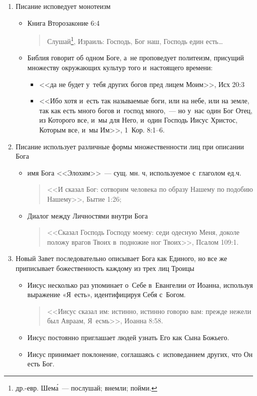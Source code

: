 \documentclass[a4paper,12pt]{article}
\begin{document}
\begin{enumerate}
    \item Писание исповедует монотеизм
        \begin{itemize}
        \item Книга Второзаконие 6:4 
        \begin{quote}
            Слушай\footnote{др.-евр. Шем\'{а}~--- послушай; внемли; пойми.}, Израиль: Господь, Бог наш, Господь един есть…
        \end{quote}
        \item Библия говорит об одном Боге, а~не проповедует политеизм, присущий множеству окружающих культур того и~настоящего времени:
        \begin{itemize}
            \item <<да не будет у~тебя других богов пред лицем Моим>>, Исх 20:3
            \item <<Ибо хотя и~есть так называемые боги, или на небе, или на земле, так как есть много богов и~господ много,~--- но у~нас один Бог Отец, из Которого все, и~мы для Него, и~один Господь Иисус Христос, Которым все, и~мы Им>>, 1~Кор. 8:1--6.
        \end{itemize}
         
        \end{itemize}
    \item Писание использует различные формы множественности лиц при описании Бога
        \begin{itemize}
        \item имя Бога <<Элохим>>~--- сущ. мн. ч, используемое с~глаголом ед.ч. 
        \begin{quote}
        <<И сказал Бог: сотворим человека по образу Нашему по подобию Нашему>>, Бытие 1:26;
        \end{quote}
        
        \item Диалог между Личностями внутри Бога 
        \begin{quote}
        <<Сказал Господь Господу моему: седи одесную Меня, доколе положу врагов Твоих в~подножие ног Твоих>>, Псалом 109:1.
        \end{quote}
    
        \end{itemize}
    
    \item Новый Завет последовательно описывает Бога как Единого, но все же приписывает божественность каждому из трех лиц Троицы
        \begin{itemize}
        \item Иисус несколько раз упоминает о~Себе в~Евангелии от Иоанна, используя выражение «Я~есть», идентифицируя Себя с~Богом. 
        \begin{quote}
            <<Иисус сказал им: истинно, истинно говорю вам: прежде нежели был Авраам, Я~есмь>>, Иоанна 8:58.
        \end{quote}
        \item Иисус постоянно приглашает людей узнать Его как Сына Божьего.
        \item Иисус принимает поклонение, соглашаясь с~исповеданием других, что Он есть Бог.
        \end{itemize}


\end{enumerate}
\end{document}
